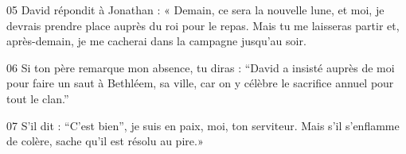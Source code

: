
05 David répondit à Jonathan : « Demain, ce sera la nouvelle lune, et moi, je devrais prendre place auprès du roi pour le repas. Mais tu me laisseras partir et, après-demain, je me cacherai dans la campagne jusqu’au soir.

06 Si ton père remarque mon absence, tu diras : “David a insisté auprès de moi pour faire un saut à Bethléem, sa ville, car on y célèbre le sacrifice annuel pour tout le clan.”

07 S’il dit : “C’est bien”, je suis en paix, moi, ton serviteur. Mais s’il s’enflamme de colère, sache qu’il est résolu au pire.»